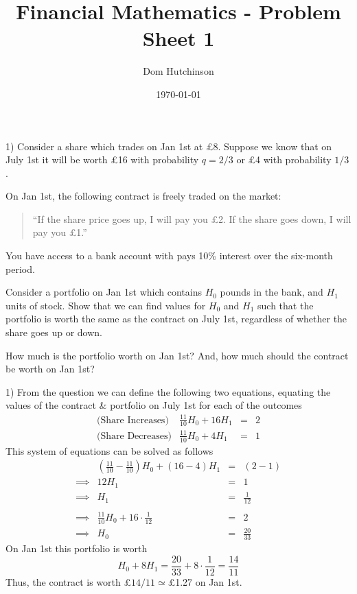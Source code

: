 \documentclass[11pt,a4paper]{article}
\begin{document}
\questionsfalse

\title{Financial Mathematics - Problem Sheet 1}
\author{Dom Hutchinson}
\date{\today}
\maketitle


\begin{question}{1)}
  Consider a share which trades on Jan 1st at £8. Suppose we know that on July 1st it will be worth £16 with probability $q=2/3$ or £4 with probability $1/3$.
  \par On Jan 1st, the following contract is freely traded on the market:
  \begin{quote}
    ``If the share price goes up, I will pay you £2. If the share goes down, I will pay you £1.''
  \end{quote}
  You have access to a bank account with pays 10\% interest over the six-month period.
  \par Consider a portfolio on Jan 1st which contains $H_0$ pounds in the bank, and $H_1$ units of stock. Show that we can find values for $H_0$ and $H_1$ such that the portfolio is worth the same as the contract on July 1st, regardless of whether the share goes up or down.
  \par How much is the portfolio worth on Jan 1st? And, how much should the contract be worth on Jan 1st?
\end{question}

\begin{answer}{1)}
  From the question we can define the following two equations, equating the values of the contract \& portfolio on July 1st for each of the outcomes
  \[\begin{array}{rrcl}
    \text{(Share Increases)}&\frac{11}{10}H_0+16H_1&=&2\\
    \text{(Share Decreases)}&\frac{11}{10}H_0+4H_1&=&1
  \end{array}\]
  This system of equations can be solved as follows
  \[\begin{array}{rrcl}
    &\left(\frac{11}{10}-\frac{11}{10}\right)H_0+(16-4)H_1&=&(2-1)\\
    \implies&12H_1&=&1\\
    \implies&H_1&=&\frac1{12}\\\\
    \implies&\frac{11}{10}H_0+16\cdot\frac1{12}&=&2\\
    \implies&H_0&=&\frac{20}{33}
  \end{array}\]
  On Jan 1st this portfolio is worth
  \[ H_0+8H_1=\frac{20}{33}+8\cdot\frac1{12}=\frac{14}{11} \]
  Thus, the contract is worth £$14/11\simeq$£1.27 on Jan 1st.
\end{answer}
\end{document}
